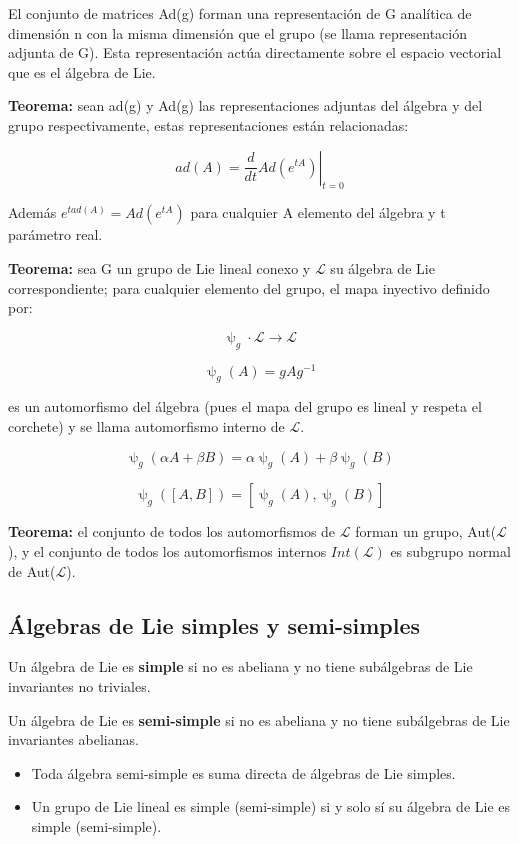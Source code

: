 \documentclass{article}
\begin{document}
El conjunto de matrices Ad(g) forman una representación de G analítica de dimensión n con la misma dimensión que el grupo (se llama representación adjunta de G). Esta representación actúa directamente sobre el espacio vectorial que es el álgebra de Lie.

\smallskip
\textbf{Teorema:} sean ad(g) y Ad(g) las representaciones adjuntas del álgebra y del grupo respectivamente, estas representaciones están relacionadas:

$$ad(A)= \left . \frac{d}{dt}Ad(e^{tA})\right |_{t=0}$$

Además $e^{t ad(A)}=Ad(e^{tA})$ para cualquier A elemento del álgebra y t parámetro real.

\smallskip
\textbf{Teorema:} sea G un grupo de Lie lineal conexo y $\mathcal{L}$ su álgebra de Lie correspondiente; para cualquier elemento del grupo, el mapa inyectivo definido por:

$$\uppsi _g \cdot \mathcal{L} \to \mathcal{L}$$

$$\uppsi _g (A)=gAg^{-1}$$

es un automorfismo del álgebra (pues el mapa del grupo es lineal y respeta el corchete) y se llama automorfismo interno de $\mathcal{L}$.

$$\uppsi _g (\alpha A + \beta B)=\alpha \uppsi _g (A) + \beta \uppsi _g (B)$$

$$\uppsi _g ([A,B])=[\uppsi _g (A), \uppsi _g (B)]$$

\smallskip
\textbf{Teorema:} el conjunto de todos los automorfismos de $\mathcal{L}$ forman un grupo, Aut($\mathcal{L}$), y el conjunto de todos los automorfismos internos $Int(\mathcal{L})$ es subgrupo normal de Aut($\mathcal{L}$).

\subsection{Álgebras de Lie simples y semi-simples}

Un álgebra de Lie es \textbf{simple} si no es abeliana y no tiene subálgebras de Lie invariantes no triviales.

Un álgebra de Lie es \textbf{semi-simple} si no es abeliana y no tiene subálgebras de Lie invariantes abelianas.

\begin{itemize}
\item Toda álgebra semi-simple es suma directa de álgebras de Lie simples.
\item Un grupo de Lie lineal es simple (semi-simple) si y solo sí su álgebra de Lie es simple (semi-simple).
\end{itemize}
\end{document}
